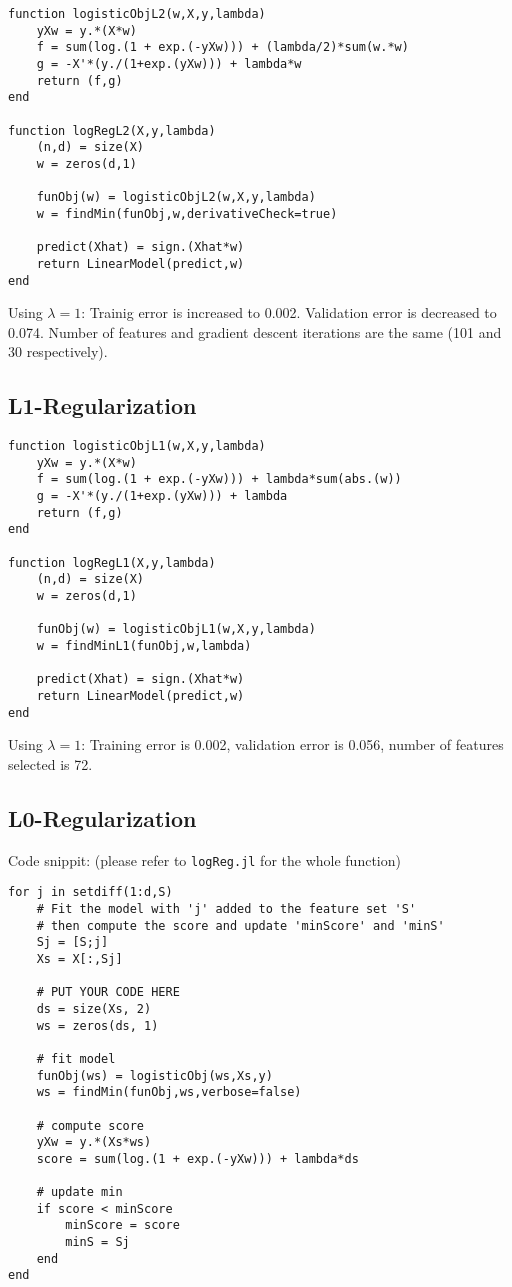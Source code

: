 \documentclass{article}
\begin{document}
\begin{verbatim}
function logisticObjL2(w,X,y,lambda)
    yXw = y.*(X*w)
    f = sum(log.(1 + exp.(-yXw))) + (lambda/2)*sum(w.*w)
    g = -X'*(y./(1+exp.(yXw))) + lambda*w
    return (f,g)
end

function logRegL2(X,y,lambda)
    (n,d) = size(X)
    w = zeros(d,1)

    funObj(w) = logisticObjL2(w,X,y,lambda)
    w = findMin(funObj,w,derivativeCheck=true)

    predict(Xhat) = sign.(Xhat*w)
    return LinearModel(predict,w)
end
\end{verbatim}
Using $\lambda = 1$:
Trainig error is increased to 0.002.
Validation error is decreased to 0.074.
Number of features and gradient descent iterations are the same (101 and 30 respectively).

\subsection{L1-Regularization}

\begin{verbatim}
function logisticObjL1(w,X,y,lambda)
    yXw = y.*(X*w)
    f = sum(log.(1 + exp.(-yXw))) + lambda*sum(abs.(w))
    g = -X'*(y./(1+exp.(yXw))) + lambda
    return (f,g)
end

function logRegL1(X,y,lambda)
    (n,d) = size(X)
    w = zeros(d,1)

    funObj(w) = logisticObjL1(w,X,y,lambda)
    w = findMinL1(funObj,w,lambda)

    predict(Xhat) = sign.(Xhat*w)
    return LinearModel(predict,w)
end
\end{verbatim}
 Using $\lambda = 1$: Training error is 0.002, validation error is 0.056, number of features selected is 72.


\subsection{L0-Regularization}

Code snippit: (please refer to \texttt{logReg.jl} for the whole function)
\begin{verbatim}
for j in setdiff(1:d,S)
    # Fit the model with 'j' added to the feature set 'S'
    # then compute the score and update 'minScore' and 'minS'
    Sj = [S;j]
    Xs = X[:,Sj]

    # PUT YOUR CODE HERE
    ds = size(Xs, 2)
    ws = zeros(ds, 1)

    # fit model
    funObj(ws) = logisticObj(ws,Xs,y)
    ws = findMin(funObj,ws,verbose=false)

    # compute score
    yXw = y.*(Xs*ws)
    score = sum(log.(1 + exp.(-yXw))) + lambda*ds

    # update min
    if score < minScore
        minScore = score
        minS = Sj
    end
end
\end{verbatim}
\end{document}
